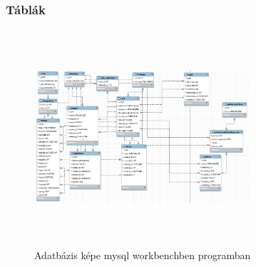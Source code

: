 \documentclass[conference]{IEEEtran}
\begin{document}
\subsubsection{\textbf{Táblák}}
\begin{figure}[htbp]
	\centerline {\includegraphics[width=8cm,height=8cm,keepaspectratio]{adatbazis.png}}
	\caption{Adatbázis képe mysql workbenchben programban}
	\label{fig1}
\end{figure}
\end{document}
